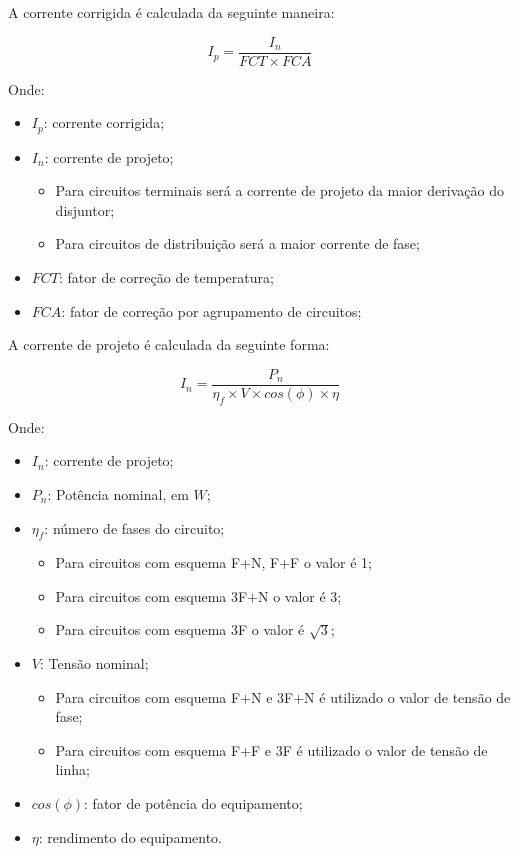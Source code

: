 A corrente corrigida é calculada da seguinte maneira:

\begin{equation}
	I_p = \frac{I_n}{FCT \times FCA} 
	\label{eqn:corrente_corrigida}
\end{equation}

Onde:

\begin{itemize}
	\item $I_p$: corrente corrigida;
	\item $I_n$: corrente de projeto;
	\begin{itemize}
		\item Para circuitos terminais será a corrente de projeto da maior derivação do disjuntor;
		\item Para circuitos de distribuição será a maior corrente de fase;
	\end{itemize}
	\item $FCT$: fator de correção de temperatura;
	\item $FCA$: fator de correção por agrupamento de circuitos;
\end{itemize}

A corrente de projeto é calculada da seguinte forma:

\begin{equation}
	I_n = \frac{P_n}{\eta_f \times V \times cos(\phi) \times \eta}
	\label{eqn:corrente_projeto}
\end{equation}

Onde:

\begin{itemize}
	\item $I_n$: corrente de projeto;
	\item $P_n$:  Potência nominal, em $W$;
	\item $\eta_f$: número de fases do circuito;
	\begin{itemize}
		\item Para circuitos com esquema F+N, F+F o valor é 1;
		\item Para circuitos com esquema 3F+N o valor é 3;
		\item Para circuitos com esquema 3F o valor é $\sqrt{3}$;
	\end{itemize}
	\item $V$: Tensão nominal;
	\begin{itemize}
		\item Para circuitos com esquema F+N e 3F+N é utilizado o valor de tensão de fase;
		\item Para circuitos com esquema F+F e 3F é utilizado o valor de tensão de linha;
	\end{itemize}
	\item $cos(\phi)$: fator de potência do equipamento;
	\item $\eta$: rendimento do equipamento.
\end{itemize}

